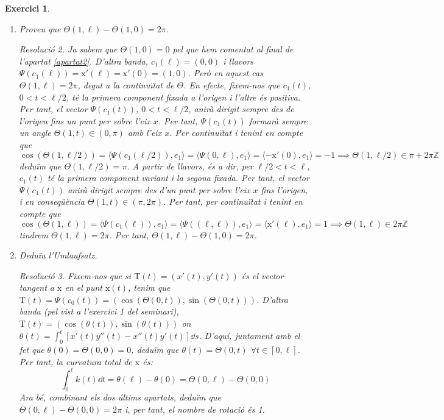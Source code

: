 \documentclass[10pt,a4paper]{article}
\newcommand{\vf}[1]{\boldsymbol{\mathrm{#1}}} %
\newcommand{\ZZ}{\ensuremath{\mathbb{Z}}}
\newtheorem{exercice}{Exercici}
\theoremstyle{remark}
\newtheorem*{resolution}{Resolució}
\theoremstyle{math}
\begin{document}
\begin{exercice}
\begin{enumerate}
\begin{resolution}
            \begin{align*}
              0=0+0 & =\left[\Theta(u_1,\ell)-\Theta(u_2,\ell)\right]-\left[\Theta(u_1,0)-\Theta(u_2,0)\right] \\
                    & =\left[\Theta(u_1,\ell)-\Theta(u_1,0)\right]-\left[\Theta(u_2,\ell)-\Theta(u_2,0)\right] \\
                    & =2\pi k_1-2\pi k_2\ne 0
            \end{align*}
            que és una contradicció. Per tant, la diferència $\Theta(u,\ell)-\Theta(u,0)$ no depèn de $u$.
          \end{resolution}
    \item Proveu que $\Theta(1,\ell)-\Theta(1,0)=2\pi$.
          \begin{resolution}
            Ja sabem que $\Theta(1,0)=0$ pel que hem comentat al final de l'apartat \ref{apartat2}. D'altra banda, $c_1(\ell)=(0,0)$ i llavors $\Psi(c_1(\ell))=\vf{x}'(\ell)=\vf{x}'(0)=(1,0)$. Però en aquest cas $\Theta(1,\ell)=2\pi$, degut a la continuïtat de $\Theta$. En efecte, fixem-nos que $c_1(t)$, $0<t<\ell/2$, té la primera component fixada a l'origen i l'altre és positiva. Per tant, el vector $\Psi(c_1(t))$, $0<t<\ell/2$, anirà dirigit sempre des de l'origen fins un punt per sobre l'eix $x$. Per tant, $\Psi(c_1(t))$ formarà sempre un angle $\Theta(1,t)\in(0,\pi)$ amb l'eix $x$. Per continuïtat i tenint en compte que $$\cos(\Theta(1,\ell/2))=\langle\Psi(c_1(\ell/2)),e_1\rangle=\langle\Psi(0,\ell),e_1\rangle=\langle-\vf{x}'(0),e_1\rangle=-1\implies\Theta(1,\ell/2)\in\pi+2\pi\ZZ$$ deduïm que $\Theta(1,\ell/2)=\pi$. A partir de llavors, és a dir, per $\ell/2<t<\ell$, $c_1(t)$ té la primera component variant i la segona fixada. Per tant, el vector $\Psi(c_1(t))$ anirà dirigit sempre des d'un punt per sobre l'eix $x$ fins l'origen, i en conseqüència $\Theta(1,t)\in(\pi,2\pi)$. Per tant, per continuïtat i tenint en compte que $$\cos(\Theta(1,\ell))=\langle\Psi(c_1(\ell)),e_1\rangle=\langle\Psi((\ell,\ell)),e_1\rangle=\langle \vf{x}'(\ell),e_1\rangle=1\implies\Theta(1,\ell)\in2\pi \ZZ$$
            tindrem $\Theta(1,\ell)=2\pi$. Per tant, $\Theta(1,\ell)-\Theta(1,0)=2\pi$.
          \end{resolution}
    \item Deduïu l'Umlaufsatz.
          \begin{resolution}
            Fixem-nos que si $\vf{T}(t)=(x'(t),y'(t))$ és el vector tangent a $\vf{x}$ en el punt $\vf{x}(t)$, tenim que $\vf{T}(t)=\Psi(c_0(t))=(\cos(\Theta(0,t)),\sin(\Theta(0,t)))$. D'altra banda (pel vist a l'exercici 1 del seminari), $\vf{T}(t)=(\cos(\theta(t)),\sin(\theta(t)))$ on $\theta(t)=\int_0^t[x'(t)y''(t)-x''(t)y'(t)]\dd s$. D'aquí, juntament amb el fet que $\theta(0)=\Theta(0,0)=0$, deduïm que $\theta(t)=\Theta(0,t)$ $\forall t\in[0,\ell]$. Per tant, la curvatura total de $\vf{x}$ és:
            $$\int_0^\ell k(t)\dd{t}=\theta(\ell)-\theta(0)=\Theta(0,\ell)-\Theta(0,0)$$
            Ara bé, combinant els dos últims apartats, deduïm que $\Theta(0,\ell)-\Theta(0,0)=2\pi$ i, per tant, el nombre de rotació és 1.


\end{resolution}
\end{enumerate}
\end{exercice}
\end{document}
